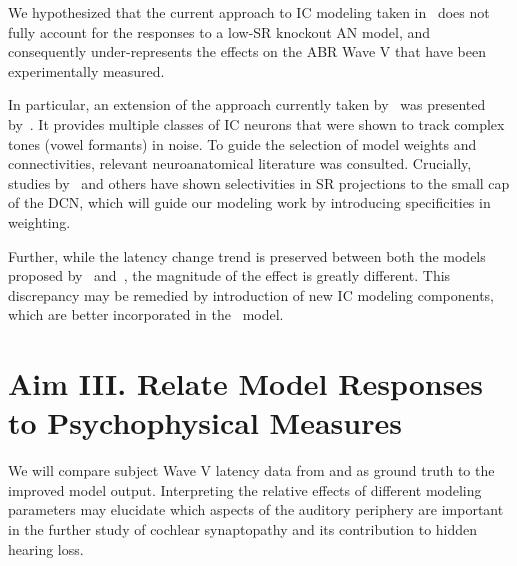 We hypothesized that the current approach to IC modeling taken in~\cite{Verhulst2015Functional,Mehraei2016Auditory} does not fully account for the responses to a low-SR knockout AN model, and consequently under-represents the effects on the ABR Wave V that have been experimentally measured.  

In particular, an extension of the approach currently taken by~\cite{Verhulst2015Functional} was presented by~\cite{Carney2015Speech}.  It provides multiple classes of IC neurons that were shown to track complex tones (vowel formants) in noise.  To guide the selection of model weights and connectivities, relevant neuroanatomical literature was consulted.  Crucially, studies by~\cite{Ryugo2008Projections} and others have shown selectivities in SR projections to the small cap of the DCN, which will guide  our modeling work by introducing specificities in weighting. 

Further, while the latency change trend is preserved between both the models proposed by~\cite{Zilany2014Updated} and~\cite{Verhulst2015Functional}, the magnitude of the effect is greatly different.  This discrepancy may be remedied by introduction of new IC modeling components, which are better incorporated in the~\cite{Zilany2014Updated} model.

\section{Aim III. Relate Model Responses to Psychophysical Measures}

We will compare subject Wave V latency data from \cite{Mehraei2015Auditory} and \cite{Mehraei2015Individual} as ground truth to the improved model output.  Interpreting the relative effects of different modeling parameters may elucidate which aspects of the auditory periphery are important in the further study of cochlear synaptopathy and its contribution to hidden hearing loss. 